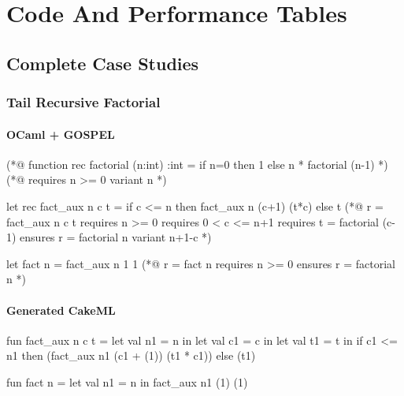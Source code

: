 
%

\chapter{Code And Performance Tables}
\label{app:appendix}

\section{Complete Case Studies}

\subsection{Tail Recursive Factorial}
\label{subsec:Tail_Recursive_Factorial}

\subsubsection*{OCaml + GOSPEL}

\begin{gospell}
(*@ 
  function rec factorial (n:int) :int = 
    if n=0 then 1 else n * factorial (n-1)
*)
(*@ 
  requires n >= 0
  variant n
*)

let rec fact_aux n c t =
  if c <= n then fact_aux n (c+1) (t*c) else t
(*@
  r = fact_aux n c t
  requires n >= 0
  requires 0 < c <= n+1
  requires t = factorial (c-1)
  ensures r = factorial n
  variant n+1-c
*)

let fact n = fact_aux n 1 1
(*@ 
  r = fact n
  requires n >= 0 
  ensures r = factorial n
*)
\end{gospell}

\newpage

\subsubsection*{Generated CakeML}

\begin{cakeml}
fun fact_aux n c t = let val n1 = n in
  let val c1 = c in
  let val t1 = t in
  if c1 <= n1 then (fact_aux n1 (c1 + (1)) (t1 * c1))  else (t1)

fun fact n = let val n1 = n in fact_aux n1 (1) (1)
\end{cakeml}

